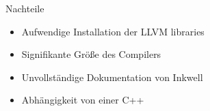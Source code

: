 \begin{frame}{Nachteile}
    \begin{itemize}
        \item<1-> Aufwendige Installation der LLVM libraries
        \item<2-> Signifikante Größe des Compilers
        \item<3-> Unvollständige Dokumentation von Inkwell
            \item<4-> Abhängigkeit von einer C++
    \end{itemize}
\end{frame}
